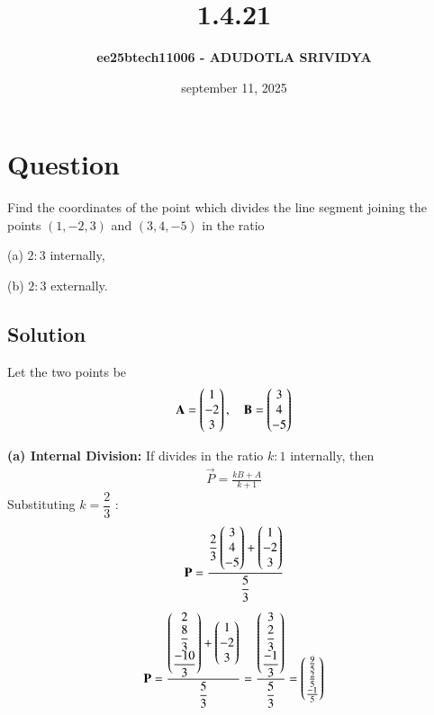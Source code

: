 \documentclass[12pt]{article}
\title{\textbf{1.4.21}}
\author{\textbf{ee25btech11006 - ADUDOTLA SRIVIDYA}}
\date {september 11, 2025}
\begin{document}
\maketitle

\section*{Question}
Find the coordinates of the point which divides the line segment joining the points $(1,-2,3)$ and $(3,4,-5)$ in the ratio  

(a) $2:3$ internally,  

(b) $2:3$ externally.  

\subsection*{Solution}

Let the two points be  
\begin{align}
\mathbf{A} = \begin{pmatrix}1 \\ -2 \\ 3\end{pmatrix}, \quad \mathbf{B} = \begin{pmatrix}3 \\ 4 \\ -5\end{pmatrix}
\end{align}

\textbf{(a) Internal Division:}  
If  divides  in the ratio $k:1$ internally, then
\begin{align}
\vec{P} = \frac{kB+A}{k+1}
\end{align}
Substituting $k=\dfrac{2}{3}$ :
\begin{align}
\mathbf{P} = \frac{\dfrac{2}{3}\begin{pmatrix}3 \\ 4 \\ -5\end{pmatrix} + \begin{pmatrix}1 \\ -2 \\ 3\end{pmatrix}}{\dfrac{5}{3}}
\end{align}
\begin{align}
\mathbf{P} = \frac{\begin{pmatrix}2 \\ \dfrac{8}{3} \\ \dfrac{-10}{3}\end{pmatrix} + \begin{pmatrix}1 \\ -2 \\ 3\end{pmatrix}}{\dfrac{5}{3}}
= \frac{\begin{pmatrix}3 \\ \dfrac{2}{3} \\ \dfrac{-1}{3}\end{pmatrix}}{\dfrac{5}{3}}
= \begin{pmatrix}\tfrac{9}{5} \\ \tfrac{2}{5} \\ \tfrac{-1}{5}\end{pmatrix}
\end{align}
\end{document}
